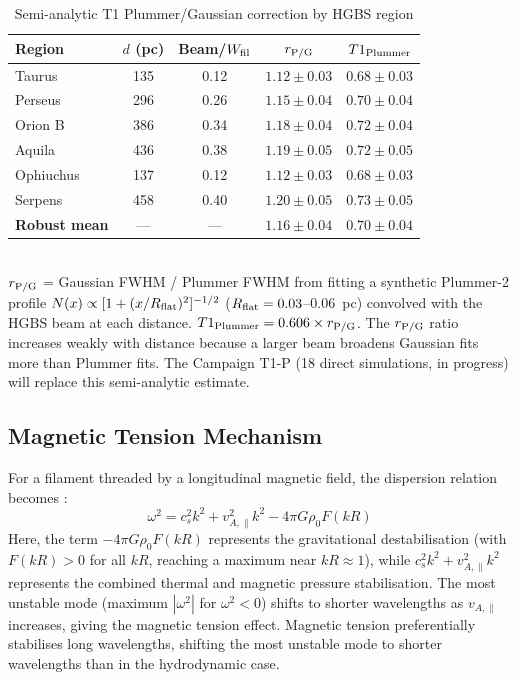 \documentclass[twoside,twocolumn]{mnras}
\begin{document}
\begin{table}[h]
\caption{Semi-analytic T1 Plummer/Gaussian correction by HGBS region}
\label{tab:t1_regions}
\small
\begin{tabular}{lcccc}
\toprule
Region & $d$ (pc) & Beam/$W_{\rm fil}$ & $r_{\rm P/G}$ & $T1_{\rm Plummer}$ \\
\midrule
Taurus    & 135 & 0.12 & $1.12 \pm 0.03$ & $0.68 \pm 0.03$ \\
Perseus   & 296 & 0.26 & $1.15 \pm 0.04$ & $0.70 \pm 0.04$ \\
Orion B   & 386 & 0.34 & $1.18 \pm 0.04$ & $0.72 \pm 0.04$ \\
Aquila    & 436 & 0.38 & $1.19 \pm 0.05$ & $0.72 \pm 0.05$ \\
Ophiuchus & 137 & 0.12 & $1.12 \pm 0.03$ & $0.68 \pm 0.03$ \\
Serpens   & 458 & 0.40 & $1.20 \pm 0.05$ & $0.73 \pm 0.05$ \\
\midrule
\textbf{Robust mean} & --- & --- & $\mathbf{1.16 \pm 0.04}$ & $\mathbf{0.70 \pm 0.04}$ \\
\bottomrule
\end{tabular}
\\[2pt]
\footnotesize $r_{\rm P/G}$ = Gaussian FWHM / Plummer FWHM from fitting a synthetic Plummer-2 profile
$N(x) \propto [1+(x/R_{\rm flat})^2]^{-1/2}$ ($R_{\rm flat} = 0.03$--$0.06$~pc) convolved with the HGBS
beam at each distance. $T1_{\rm Plummer} = 0.606 \times r_{\rm P/G}$. The $r_{\rm P/G}$ ratio increases 
weakly with distance because a larger beam broadens Gaussian fits more than Plummer fits.
The Campaign T1-P (18 direct simulations, in progress) will replace this semi-analytic estimate.
\end{table}

\subsection{Magnetic Tension Mechanism}

For a filament threaded by a longitudinal magnetic field, the dispersion relation
becomes \citep{Nakamura1993}:
\begin{equation}
\omega^2 = c_s^2 k^2 + v_{A,\parallel}^2 k^2 - 4\pi G\rho_0 F(kR)
\label{eq:dispersion}
\end{equation}
Here, the term $-4\pi G\rho_0 F(kR)$ represents the gravitational destabilisation (with $F(kR) > 0$ for all $kR$, reaching a maximum near $kR \approx 1$), while $c_s^2 k^2 + v_{A,\parallel}^2 k^2$ represents the combined thermal and magnetic pressure stabilisation. The most unstable mode (maximum $|\omega^2|$ for $\omega^2 < 0$) shifts to shorter wavelengths as $v_{A,\parallel}$ increases, giving the magnetic tension effect.
Magnetic tension preferentially stabilises long wavelengths, shifting the most unstable
mode to shorter wavelengths than in the hydrodynamic case.
\end{document}

